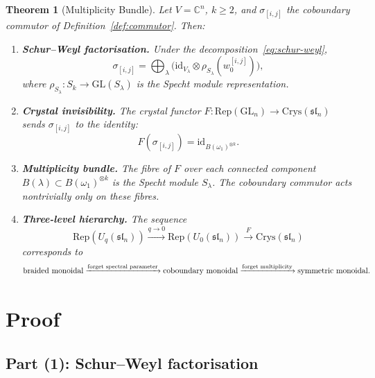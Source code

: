 \documentclass[11pt]{article}
\newtheorem{theorem}{Theorem}
\theoremstyle{remark}
\newcommand{\CC}{\mathbb{C}}
\newcommand{\Rep}{\mathrm{Rep}}
\newcommand{\Crys}{\mathrm{Crys}}
\newcommand{\GL}{\mathrm{GL}}
\newcommand{\id}{\mathrm{id}}
\begin{document}
\begin{theorem}[Multiplicity Bundle]\label{thm:main}
Let $V = \CC^n$, $k \geq 2$, and $\sigma_{[i,j]}$ the coboundary commutor
of Definition~\ref{def:commutor}. Then:

\begin{enumerate}
  \item[\textbf{(1)}] \textbf{Schur--Weyl factorisation.}
    Under the decomposition~\eqref{eq:schur-weyl},
    \begin{equation}\label{eq:factorisation}
      \sigma_{[i,j]} = \bigoplus_{\lambda} \bigl(
        \id_{V_\lambda} \otimes \rho_{S_\lambda}(w_0^{[i,j]})
      \bigr),
    \end{equation}
    where $\rho_{S_\lambda}\colon S_k \to \GL(S_\lambda)$ is the Specht
    module representation.

  \item[\textbf{(2)}] \textbf{Crystal invisibility.}
    The crystal functor $F\colon \Rep(\GL_n) \to \Crys(\mathfrak{sl}_n)$
    sends $\sigma_{[i,j]}$ to the identity:
    \[
      F(\sigma_{[i,j]}) = \id_{B(\omega_1)^{\otimes k}}.
    \]

  \item[\textbf{(3)}] \textbf{Multiplicity bundle.}
    The fibre of $F$ over each connected component $B(\lambda) \subset
    B(\omega_1)^{\otimes k}$ is the Specht module $S_\lambda$. The
    coboundary commutor acts nontrivially only on these fibres.

  \item[\textbf{(4)}] \textbf{Three-level hierarchy.}
    The sequence
    \[
      \Rep(U_q(\mathfrak{sl}_n))
      \xrightarrow{q \to 0}
      \Rep(U_0(\mathfrak{sl}_n))
      \xrightarrow{F}
      \Crys(\mathfrak{sl}_n)
    \]
    corresponds to
    \[
      \textup{braided monoidal}
      \xrightarrow{\textup{forget spectral parameter}}
      \textup{coboundary monoidal}
      \xrightarrow{\textup{forget multiplicity}}
      \textup{symmetric monoidal}.
    \]
\end{enumerate}
\end{theorem}

\section{Proof}

\subsection{Part (1): Schur--Weyl factorisation}
\end{document}
